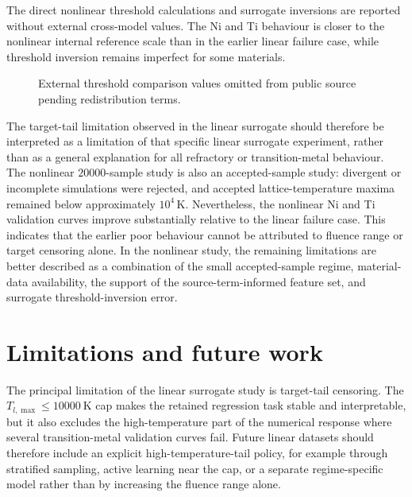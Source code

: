 The direct nonlinear threshold calculations and surrogate inversions are reported without external cross-model values. The Ni and Ti behaviour is closer to the nonlinear internal reference scale than in the earlier linear failure case, while threshold inversion remains imperfect for some materials.

\begin{table}[htbp]
    \centering
    \caption[Nonlinear threshold comparison omitted]{External threshold comparison values omitted from public source pending redistribution terms.}
    \label{tab:ch4-external-threshold-comparison}
    \scriptsize
    \PublicExternalValuesOmitted[0.82\textwidth]
\end{table}

\begin{figure}[htbp]
    \centering
    \PublicExternalValuesOmitted[0.82\textwidth]
    \caption[Nonlinear threshold comparison omitted]{External threshold comparison values omitted from public source pending redistribution terms.}
    \label{fig:ch4-nonlinear-threshold-comparison}
\end{figure}

The target-tail limitation observed in the linear surrogate should therefore be interpreted as a limitation of that specific linear surrogate experiment, rather than as a general explanation for all refractory or transition-metal behaviour. The nonlinear \(\num{20000}\)-sample study is also an accepted-sample study: divergent or incomplete simulations were rejected, and accepted lattice-temperature maxima remained below approximately \(10^4\,\mathrm{K}\). Nevertheless, the nonlinear Ni and Ti validation curves improve substantially relative to the linear failure case. This indicates that the earlier poor behaviour cannot be attributed to fluence range or target censoring alone. In the nonlinear study, the remaining limitations are better described as a combination of the small accepted-sample regime, material-data availability, the support of the source-term-informed feature set, and surrogate threshold-inversion error.

\section{Limitations and future work}

The principal limitation of the linear surrogate study is target-tail censoring. The $T_{l,\max}\leq\SI{10000}{\kelvin}$ cap makes the retained regression task stable and interpretable, but it also excludes the high-temperature part of the numerical response where several transition-metal validation curves fail. Future linear datasets should therefore include an explicit high-temperature-tail policy, for example through stratified sampling, active learning near the cap, or a separate regime-specific model rather than by increasing the fluence range alone.

